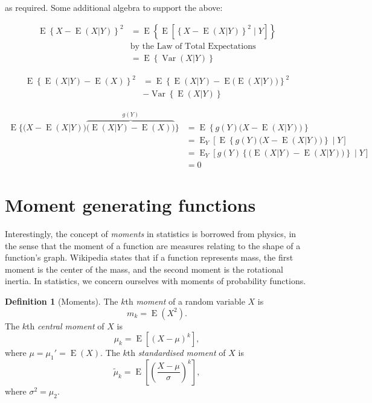 \documentclass[
]{book}
\DeclareMathOperator{\E}{E}
\DeclareMathOperator{\Var}{Var}
\theoremstyle{definition}
\newtheorem{definition}{Definition}[chapter]
\theoremstyle{definition}
\theoremstyle{definition}
\theoremstyle{definition}
\theoremstyle{remark}
\begin{document}
as required.
Some additional algebra to support the above:

\begin{align*}
\E\left\{X - \E(X|Y)\right\}^2 
&=\E\left\{\E\left[\left\{X - \E(X|Y)\right\}^2 \mid Y \right]\right\}\\
&\text{by the Law of Total Expectations} \\
&= \E\left\{\Var(X|Y) \right\}
\end{align*}

\begin{align*}
\E\left\{\E(X|Y) - \E(X) \right\}^2
&= \E\left\{\E(X|Y) - \E\big(\E(X|Y)\big) \right\}^2 \\
&- \Var\left\{ \E(X|Y) \right\}
\end{align*}

\begin{align*}
\E \bigg\{\big(X - \E(X|Y)\big) \overbrace{\big(\E(X|Y) - \E(X)\big)}^{g(Y)} \bigg\} 
&= \E\left\{g(Y) \big(X - \E(X|Y)\big) \right\}\\ 
&= \E_Y \left[ \E\left\{g(Y) \big(X - \E(X|Y)\big) \right\} \mid Y \right] \\
&= \E_Y \left[ g(Y) \left\{ \big(\E(X|Y) - \E(X|Y)\big) \right\} \mid Y \right] \\
&= 0
\end{align*}

\hypertarget{moment-generating-functions}{%
\section{Moment generating functions}\label{moment-generating-functions}}

Interestingly, the concept of \emph{moments} in statistics is borrowed from physics, in the sense that the moment of a function are measures relating to the shape of a function's graph.
Wikipedia states that if a function represents mass, the first moment is the center of the mass, and the second moment is the rotational inertia.
In statistics, we concern ourselves with moments of probability functions.

\begin{definition}[Moments]
The \(k\)th \emph{moment} of a random variable \(X\) is
\[
m_k = \E(X^2).
\]
The \(k\)th \emph{central moment} of \(X\) is
\[
\mu_k = \E\left[(X-\mu)^k \right],
\]
where \(\mu=\mu_1'=\E(X)\).
The \(k\)th \emph{standardised moment} of \(X\) is
\[
\tilde\mu_k = \E\left[\left(\frac{X-\mu}{\sigma}\right)^k \right],
\]
where \(\sigma^2 = \mu_2\).
\end{definition}
\end{document}
